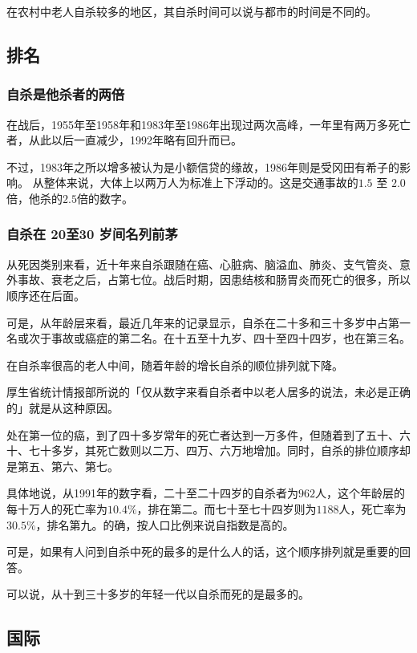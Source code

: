 \documentclass[UTF8]{ctexart}
\begin{document}
在农村中老人自杀较多的地区，其自杀时间可以说与都市的时间是不同的。

\subsection{排名}

\subsubsection*{自杀是他杀者的两倍}

在战后，1955年至1958年和1983年至1986年出现过两次高峰，一年里有两万多死亡者，从此以后一直减少，1992年略有回升而已。

不过，1983年之所以增多被认为是小额信贷的缘故，1986年则是受冈田有希子的影响。
从整体来说，大体上以两万人为标准上下浮动的。这是交通事故的$1.5$ 至 $2.0$倍，他杀的$2.5$倍的数字。

\subsubsection*{自杀在 20至30 岁间名列前茅}

从死因类别来看，近十年来自杀跟随在癌、心脏病、脑溢血、肺炎、支气管炎、意外事故、衰老之后，占第七位。战后时期，因患结核和肠胃炎而死亡的很多，所以顺序还在后面。

可是，从年龄层来看，最近几年来的记录显示，自杀在二十多和三十多岁中占第一名或次于事故或癌症的第二名。在十五至十九岁、四十至四十四岁，也在第三名。

在自杀率很高的老人中间，随着年龄的增长自杀的顺位排列就下降。

厚生省统计情报部所说的「仅从数字来看自杀者中以老人居多的说法，未必是正确的」就是从这种原因。

处在第一位的癌，到了四十多岁常年的死亡者达到一万多件，但随着到了五十、六十、七十多岁，其死亡数则以二万、四万、六万地增加。同时，自杀的排位顺序却是第五、第六、第七。

具体地说，从1991年的数字看，二十至二十四岁的自杀者为$962$人，这个年龄层的每十万人的死亡率为$10.4\%$，排在第二。而七十至七十四岁则为$1188$人，死亡率为$30.5\%$，排名第九。的确，按人口比例来说自指数是高的。

可是，如果有人问到自杀中死的最多的是什么人的话，这个顺序排列就是重要的回答。

可以说，从十到三十多岁的年轻一代以自杀而死的是最多的。

\subsection{国际}
\end{document}
